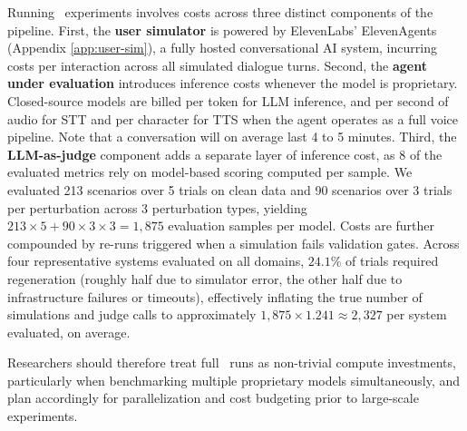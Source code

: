 Running \framework~experiments involves costs across three distinct components of the pipeline. First, the \textbf{user simulator} is powered by ElevenLabs' ElevenAgents (Appendix \ref{app:user-sim}), a fully hosted conversational AI system, incurring costs per interaction across all simulated dialogue turns.
Second, the \textbf{agent under evaluation} introduces inference costs whenever the model is proprietary. Closed-source models are billed per token for LLM inference, and per second of audio for STT and per character for TTS when the agent operates as a full voice pipeline. Note that a conversation will on average last 4 to 5 minutes.
Third, the \textbf{LLM-as-judge} component adds a separate layer of inference cost, as 8 of the evaluated metrics rely on model-based scoring computed per sample.
We evaluated 213 scenarios over 5 trials on clean data and 90 scenarios over 3 trials per perturbation across 3 perturbation types, yielding $213 \times 5 + 90 \times 3 \times 3 = 1{,}875$ evaluation samples per model. Costs are further compounded by re-runs triggered when a simulation fails validation gates. Across four representative systems evaluated on all domains, $24.1\%$ of trials required regeneration (roughly half due to simulator error, the other half due to infrastructure failures or timeouts), effectively inflating the true number of simulations and judge calls to approximately $1{,}875 \times 1.241 \approx 2{,}327$ per system evaluated, on average.

Researchers should therefore treat full \framework~runs as non-trivial compute investments, particularly when benchmarking multiple proprietary models simultaneously, and plan accordingly for parallelization and cost budgeting prior to large-scale experiments.
